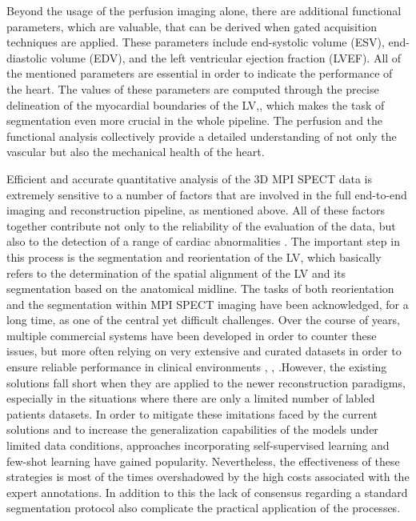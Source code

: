 Beyond the usage of the perfusion imaging alone, there are additional functional parameters, which are valuable, that can be derived when gated acquisition techniques are applied. These parameters include end-systolic volume (ESV), end-diastolic volume (EDV), and the left ventricular ejection fraction (LVEF). All of the mentioned parameters are essential in order to indicate the performance of the heart. The values of these parameters are computed through the precise delineation of the myocardial boundaries of the LV,, which makes the task of segmentation even more crucial in the whole pipeline. The perfusion and the functional analysis collectively provide a detailed understanding of not only the vascular but also the mechanical health of the heart.

Efficient and accurate quantitative analysis of the 3D MPI SPECT data is extremely sensitive to a number of factors that are involved in the full end-to-end imaging and reconstruction pipeline, as mentioned above. All of these factors together contribute not only to the reliability of the evaluation of the data, but also to the detection of a range of cardiac abnormalities \cite{SLOMKA2012338}. The important step in this process is the segmentation and reorientation of the LV, which basically refers to the determination of the spatial alignment of the LV and its segmentation based on the anatomical midline. The tasks of both reorientation and the segmentation within MPI SPECT imaging have been acknowledged, for a long time, as one of the central yet difficult challenges. Over the course of years, multiple commercial systems have been developed in order to counter these issues, but more often relying on very extensive and curated datasets in order to ensure reliable performance in clinical environments \cite{Garcia2007}, \cite{Liu2007}, \cite{Ficaro2007}.However, the existing solutions fall short when they are applied to the newer reconstruction paradigms, especially in the situations where there are only a limited number of labled patients datasets. In order to mitigate these imitations faced by the current solutions and to increase the generalization capabilities of the models under limited data conditions, approaches incorporating self-supervised learning and few-shot learning have gained popularity. Nevertheless, the effectiveness of these strategies is most of the times overshadowed by the high costs associated with the expert annotations. In addition to this the lack of consensus regarding a standard segmentation protocol also complicate the practical application of the processes.

